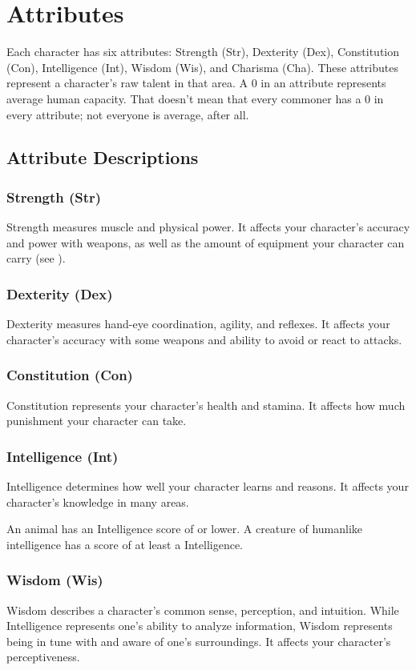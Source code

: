\chapter{Attributes}
Each character has six attributes: Strength (Str), Dexterity (Dex), Constitution (Con), Intelligence (Int), Wisdom (Wis), and Charisma (Cha). These attributes represent a character's raw talent in that area. A 0 in an attribute represents average human capacity. That doesn't mean that every commoner has a 0 in every attribute; not everyone is average, after all.

\section{Attribute Descriptions}

\subsection{Strength (Str)}
Strength measures muscle and physical power. It affects your character's accuracy and power with weapons, as well as the amount of equipment your character can carry (see ).

\subsection{Dexterity (Dex)}
Dexterity measures hand-eye coordination, agility, and reflexes. It affects your character's accuracy with some weapons and ability to avoid or react to attacks.

\subsection{Constitution (Con)}
Constitution represents your character's health and stamina. It affects how much punishment your character can take.

\subsection{Intelligence (Int)}
Intelligence determines how well your character learns and reasons. It affects your character's knowledge in many areas.

\par An animal has an Intelligence score of  or lower. A creature of humanlike intelligence has a score of at least a  Intelligence.

\subsection{Wisdom (Wis)}
Wisdom describes a character's common sense, perception, and intuition. While Intelligence represents one's ability to analyze information, Wisdom represents being in tune with and aware of one's surroundings. It affects your character's perceptiveness.

